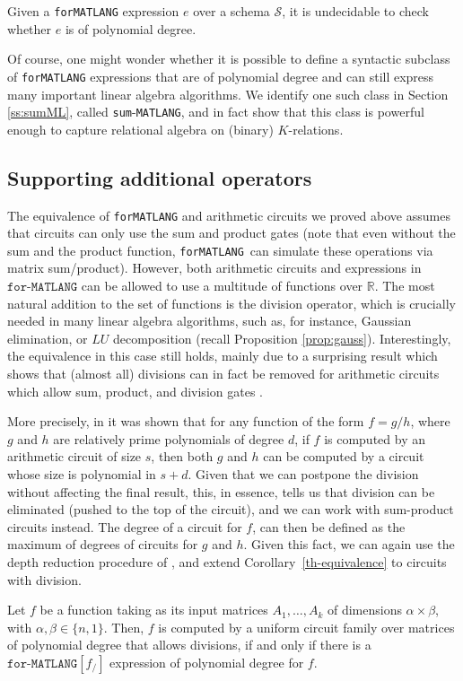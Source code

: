 \documentclass[sigconf]{acmart}
\newcommand{\RR}{\mathbb{R}}
\newcommand{\Sch}{\mathcal{S}}
\newcommand{\langfor}{\texttt{for}\text{-}\texttt{MATLANG}\xspace}
\newcommand{\langforf}[1]{\texttt{for}\text{-}\texttt{MATLANG}[#1]\xspace}
\newcommand{\langsum}{\texttt{sum}-\texttt{MATLANG}\xspace}
\begin{document}
\begin{proposition}
\label{prop-undec}
Given a \langfor expression $e$ over a schema $\Sch$, it is undecidable to check whether $e$ is of polynomial degree.
\end{proposition}

Of course, one might wonder whether it is possible to define a syntactic subclass of \langfor expressions that are of polynomial degree and can still express many important linear algebra algorithms. We identify one such class in Section \ref{ss:sumML}, called \langsum, and in fact show that this class is powerful enough to capture relational algebra on (binary) $K$-relations. 

\subsection{Supporting additional operators}
The equivalence of \langfor and arithmetic circuits we proved above assumes that circuits can only use the sum and product gates (note that even without the sum and the product function, \langfor\ can simulate these operations via matrix sum/product). However, both arithmetic circuits and expressions in $\langfor$ can be allowed to use a multitude of functions over $\RR$. The most natural addition to the set of functions is the division operator, which is crucially needed in many linear algebra algorithms, such as, for instance, Gaussian elimination, or $LU$ decomposition (recall Proposition \ref{prop:gauss}).
Interestingly, the equivalence in this case still holds, mainly due to a surprising result which shows that (almost all) divisions can in fact be removed for arithmetic circuits which allow sum, product, and division gates \cite{allender}.

More precisely, in \cite{strassen1973vermeidung,borodin1982fast,kaltofen1988greatest} it was shown that for any function of the form $f = g/h$, where $g$ and $h$ are relatively prime polynomials of degree $d$, if $f$ is computed by an arithmetic circuit of size $s$, then both $g$ and $h$ can be computed by a circuit whose size is polynomial in $s + d$. Given that we can postpone the division without affecting the final result, this, in essence, tells us that division can be eliminated (pushed to the top of the circuit), and we can work with sum-product circuits instead. The degree of a circuit for $f$, can then be defined as the maximum of degrees of circuits for $g$ and $h$. Given this fact, we can again use the depth reduction procedure of \cite{AllenderJMV98}, and extend Corollary~\ref{th-equivalence} to circuits with division.
\begin{corollary}
\label{cor-division}
Let $f$ be a function taking as its input matrices $A_1,\ldots ,A_k$ of dimensions $\alpha\times \beta$, with $\alpha,\beta \in \{n,1\}$. Then, $f$ is computed by a uniform circuit family over matrices of polynomial degree that allows divisions, if and only if there is a $\langforf{f_/}$ expression of polynomial degree for $f$.
\end{corollary}
\end{document}
